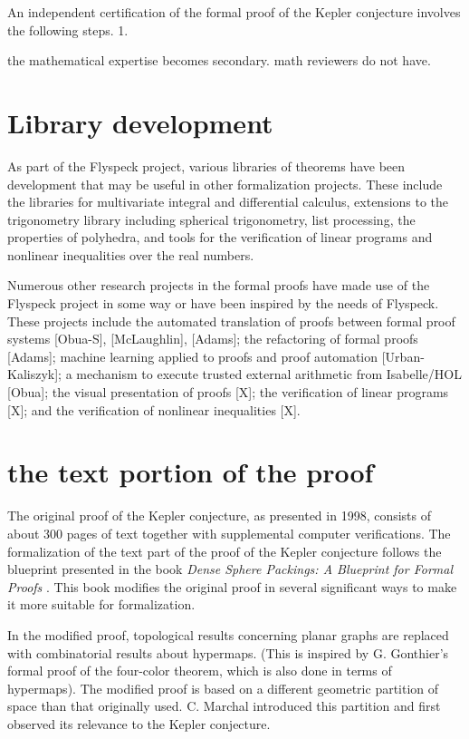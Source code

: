 An independent certification of the formal proof of the Kepler conjecture involves the following steps.
1.  


the mathematical expertise becomes secondary.
math reviewers do not have.

\section{Library development} 

As part of the Flyspeck project, various libraries of theorems have been development that may be useful in other formalization
projects.  These include the libraries for multivariate integral and differential calculus, extensions to the trigonometry
library including spherical trigonometry, list processing,
the properties of polyhedra,  and tools for the verification of linear programs and nonlinear
inequalities over the real numbers.

Numerous other research projects in the formal proofs have made use of the Flyspeck project in some way or have been inspired by
the needs of Flyspeck.  These projects include the automated translation of proofs between formal proof systems
[Obua-S], [McLaughlin], [Adams]; the refactoring of formal proofs [Adams]; machine learning applied to proofs and
proof automation [Urban-Kaliszyk]; a mechanism to execute trusted external arithmetic 
from Isabelle/HOL [Obua]; the visual presentation of proofs [X]; the verification of linear programs [X]; and the
verification of nonlinear inequalities [X].

\section{the text portion of the proof}

The original proof of the Kepler conjecture, as presented in 1998, consists of about 300 pages of text together with supplemental
computer verifications.    The formalization of the text part of the proof of the Kepler conjecture follows the blueprint presented
in the book {\it Dense Sphere Packings: A Blueprint for Formal Proofs} \cite{XX}.  This book modifies the original proof in several
significant ways to make it more suitable for formalization.   

In the modified proof,  topological results concerning planar graphs are replaced with combinatorial results about hypermaps.
(This is inspired by G. Gonthier's formal proof of the four-color theorem, which is also done in terms of hypermaps).
The modified proof is based on a different geometric partition of space than that originally used.  C. Marchal
introduced this partition and first observed its
relevance to the Kepler conjecture.  


